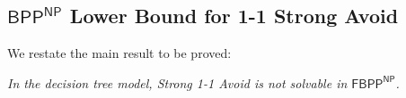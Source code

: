 





\subsection{\texorpdfstring{$\mathsf{BPP^{NP}}$}{BPP\^NP} Lower Bound for 1-1 Strong Avoid}
\label{sec:BPP-NP-lb}
We restate the main result to be proved:

\medskip
{}
{\it In the decision tree model, {\sc Strong 1-1 Avoid} is not solvable in $\mathsf{FBPP^{NP}}$.}

